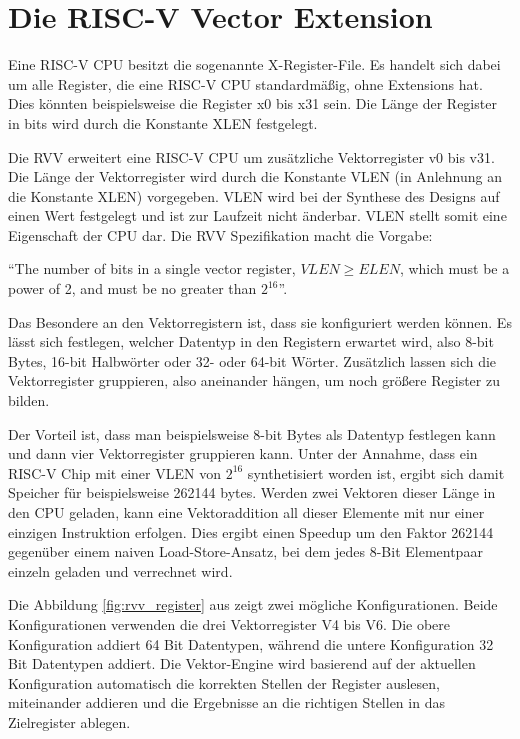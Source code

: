 \section{Die RISC-V Vector Extension} \label{sec:riscv_rvv_extension}

Eine RISC-V CPU besitzt die sogenannte X-Register-File. Es handelt sich dabei um alle Register, die eine RISC-V CPU standardmäßig, ohne Extensions hat. Dies könnten beispielsweise die Register x0 bis x31 sein. Die Länge der Register in bits wird durch die Konstante XLEN festgelegt.

Die \gls{RVV} erweitert eine RISC-V CPU um zusätzliche Vektorregister v0 bis v31. Die Länge der Vektorregister wird durch die Konstante \gls{VLEN} (in Anlehnung an die Konstante \gls{XLEN}) vorgegeben. \gls{VLEN} wird bei der Synthese des Designs auf einen Wert festgelegt und ist zur Laufzeit nicht änderbar. \gls{VLEN} stellt somit eine Eigenschaft der CPU dar. Die \gls{RVV} Spezifikation \cite{rvv_specification} macht die Vorgabe:

``The number of bits in a single vector register, \(VLEN \geq ELEN\), which must be a power of 2, and must be no greater than \(2^{16}\)''.

Das Besondere an den Vektorregistern ist, dass sie konfiguriert werden können. Es lässt sich festlegen, welcher Datentyp in den Registern erwartet wird, also 8-bit Bytes, 16-bit Halbwörter oder 32- oder 64-bit Wörter. Zusätzlich lassen sich die Vektorregister gruppieren, also aneinander hängen, um noch größere Register zu bilden.

Der Vorteil ist, dass man beispielsweise 8-bit Bytes als Datentyp festlegen kann und dann vier Vektorregister gruppieren kann. Unter der Annahme, dass ein RISC-V Chip mit einer VLEN von \(2^{16}\) synthetisiert worden ist, ergibt sich damit Speicher für beispielsweise 262144 bytes. Werden zwei Vektoren dieser Länge in den CPU geladen, kann eine Vektoraddition all dieser Elemente mit nur einer einzigen Instruktion erfolgen. Dies ergibt einen Speedup um den Faktor 262144 gegenüber einem naiven Load-Store-Ansatz, bei dem jedes 8-Bit Elementpaar einzeln geladen und verrechnet wird.

Die Abbildung \ref{fig:rvv_register} aus \cite{intro_rvv} zeigt zwei mögliche Konfigurationen. Beide Konfigurationen verwenden die drei Vektorregister V4 bis V6. Die obere Konfiguration addiert 64 Bit Datentypen, während die untere Konfiguration 32 Bit Datentypen addiert. Die Vektor-Engine wird basierend auf der aktuellen Konfiguration automatisch die korrekten Stellen der Register auslesen, miteinander addieren und die Ergebnisse an die richtigen Stellen in das Zielregister ablegen.

